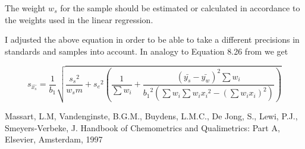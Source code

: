 \documentclass[a4paper]{article}
\begin{document}
The weight $w_s$ for the sample should be estimated or calculated in accordance
to the weights used in the linear regression. 

I adjusted the above equation in order to be able to take a different precisions
in standards and samples into account. In analogy to Equation 8.26 from \cite{massart97}
we get

\begin{equation}
s_{\hat{x_s}} = \frac{1}{b_1} \sqrt{\frac{{s_s}^2}{w_s m} + 
    {s_e}^2 \left( \frac{1}{\sum{w_i}} +
        \frac{(\bar{y_s} - \bar{y_w})^2 \sum{w_i}}
            {{b_1}^2 \left( \sum{w_i} \sum{w_i {x_i}^2} - {\left( \sum{ w_i x_i } \right)}^2 \right) } \right) }
\end{equation}

\begin{thebibliography}{1}
Massart, L.M, Vandenginste, B.G.M., Buydens, L.M.C., De Jong, S., Lewi, P.J.,
Smeyers-Verbeke, J. 
\newblock Handbook of Chemometrics and Qualimetrics: Part A,
\newblock Elsevier, Amsterdam, 1997
\end{thebibliography}
\end{document}
